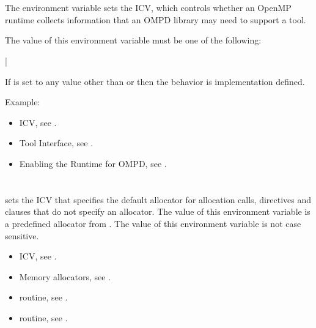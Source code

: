 \section{}
\label{sec:OMP_DEBUG}

The  environment variable sets the  ICV, 
which controls whether an OpenMP runtime collects information that an 
OMPD library may need to support a tool.

The value of this environment variable must be one of the following:

{|}

If  is set to any value other than 
or  then the behavior is implementation defined.

Example:
\begin{ompEnv}
\end{ompEnv}

\crossreferences
\begin{itemize}
\item {} ICV,
see .

\item Tool Interface, see .

\item Enabling the Runtime for OMPD, see .
\end{itemize}



\section{}
\label{sec:OMP_ALLOCATOR}

 sets the  ICV that specifies 
the default allocator for allocation calls, directives and clauses that 
do not specify an allocator. The value of this environment variable is a 
predefined allocator from . The value 
of this environment variable is not case sensitive.

\crossreferences
\begin{itemize}
\item {} ICV, see .

\item Memory allocators, see .

\item {} routine, 
see .

\item {} routine, 
see .
\end{itemize}
